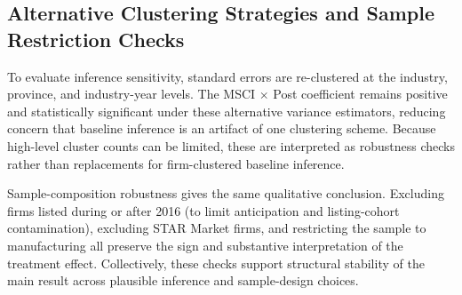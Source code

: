 \subsection{Alternative Clustering Strategies and Sample Restriction Checks}

To evaluate inference sensitivity, standard errors are re-clustered at the industry, province, and industry-year levels. The MSCI $\times$ Post coefficient remains positive and statistically significant under these alternative variance estimators, reducing concern that baseline inference is an artifact of one clustering scheme. Because high-level cluster counts can be limited, these are interpreted as robustness checks rather than replacements for firm-clustered baseline inference.

Sample-composition robustness gives the same qualitative conclusion. Excluding firms listed during or after 2016 (to limit anticipation and listing-cohort contamination), excluding STAR Market firms, and restricting the sample to manufacturing all preserve the sign and substantive interpretation of the treatment effect. Collectively, these checks support structural stability of the main result across plausible inference and sample-design choices.


